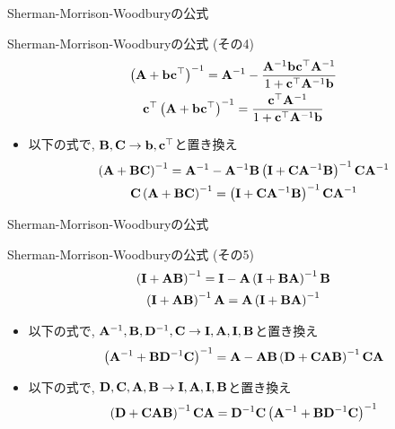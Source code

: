 \documentclass[dvipdfmx,notheorems,t]{beamer}
\begin{document}
\begin{frame}{Sherman-Morrison-Woodburyの公式}
\begin{block}{Sherman-Morrison-Woodburyの公式 (その4)}
  \begin{gather*}
    \left( \vb{A} + \vb{b} \vb{c}^\top \right)^{-1}
      = \vb{A}^{-1} - \frac{\vb{A}^{-1} \vb{b} \vb{c}^\top \vb{A}^{-1}}{1 + \vb{c}^\top \vb{A}^{-1} \vb{b}} \\
    \vb{c}^\top \left( \vb{A} + \vb{b} \vb{c}^\top \right)^{-1}
      = \frac{\vb{c}^\top \vb{A}^{-1}}{1 + \vb{c}^\top \vb{A}^{-1} \vb{b}}
  \end{gather*}
\end{block}

\begin{itemize}
  \item 以下の式で, $\vb{B}, \vb{C} \to \vb{b}, \vb{c}^\top$と置き換え
  \begin{gather*}
    \left( \vb{A} + \vb{B} \vb{C} \right)^{-1}
      = \vb{A}^{-1} - \vb{A}^{-1} \vb{B}
        \left( \vb{I} + \vb{C} \vb{A}^{-1} \vb{B} \right)^{-1} \vb{C} \vb{A}^{-1} \\
    \vb{C} \left( \vb{A} + \vb{B} \vb{C} \right)^{-1}
      = \left( \vb{I} + \vb{C} \vb{A}^{-1} \vb{B} \right)^{-1} \vb{C} \vb{A}^{-1}
  \end{gather*}
\end{itemize}
\end{frame}

\begin{frame}{Sherman-Morrison-Woodburyの公式}
\begin{block}{Sherman-Morrison-Woodburyの公式 (その5)}
  \begin{gather*}
    \left( \vb{I} + \vb{A} \vb{B} \right)^{-1}
      = \vb{I} - \vb{A} \left( \vb{I} + \vb{B} \vb{A} \right)^{-1} \vb{B} \\
    \left( \vb{I} + \vb{A} \vb{B} \right)^{-1} \vb{A}
      = \vb{A} \left( \vb{I} + \vb{B} \vb{A} \right)^{-1}
  \end{gather*}
\end{block}

\begin{itemize}
  \item 以下の式で, $\vb{A}^{-1}, \vb{B}, \vb{D}^{-1}, \vb{C} \to \vb{I}, \vb{A}, \vb{I}, \vb{B}$と置き換え
  $$\left( \vb{A}^{-1} + \vb{B} \vb{D}^{-1} \vb{C} \right)^{-1}
    = \vb{A} - \vb{A} \vb{B}
      \left( \vb{D} + \vb{C} \vb{A} \vb{B} \right)^{-1} \vb{C} \vb{A}$$
  \item 以下の式で, $\vb{D}, \vb{C}, \vb{A}, \vb{B} \to \vb{I}, \vb{A}, \vb{I}, \vb{B}$と置き換え
  $$\left( \vb{D} + \vb{C} \vb{A} \vb{B} \right)^{-1} \vb{C} \vb{A}
    = \vb{D}^{-1} \vb{C} \left( \vb{A}^{-1} + \vb{B} \vb{D}^{-1} \vb{C} \right)^{-1}$$
\end{itemize}
\end{frame}
\end{document}
